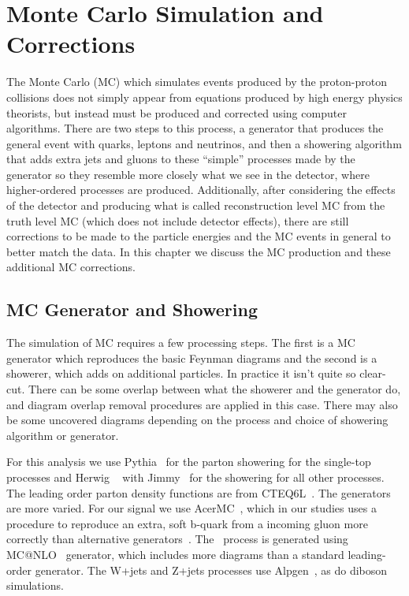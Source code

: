 \chapter{Monte Carlo Simulation and Corrections}\label{chap:MC}
The Monte Carlo (MC) which simulates events produced by the proton-proton collisions does not simply appear from equations produced by high energy physics theorists, but instead must be produced and corrected using computer algorithms.  There are two steps to this process, a generator that produces the general event with quarks, leptons and neutrinos, and then a showering algorithm that adds extra jets and gluons to these ``simple'' processes made by the generator so they resemble more closely what we see in the detector, where higher-ordered processes are produced.  Additionally, after considering the effects of the detector and producing what is called reconstruction level MC from the truth level MC (which does not include detector effects), there are still corrections to be made to the particle energies and the MC events in general to better match the data.  In this chapter we discuss the MC production and these additional MC corrections.

\section{MC Generator and Showering}

The simulation of MC requires a few processing steps.  The first is a MC generator which reproduces the basic Feynman diagrams and the second is a showerer, which adds on additional particles.  In practice it isn't quite so clear-cut.  There can be some overlap between what the showerer and the generator do, and diagram overlap removal procedures are applied in this case.  There may also be some uncovered diagrams depending on the process and choice of showering algorithm or generator.

For this analysis we use {\sc Pythia}~\cite{SAMPLES-PYTHIA} for the parton showering for the single-top processes and {\sc Herwig} ~\cite{SAMPLES-HERWIG} with {\sc Jimmy}~\cite{SAMPLES-JIMMY} for the showering for all other processes.  The leading order parton density functions are from {\sc CTEQ6L}~\cite{cteq6}.  The generators are more varied.  For our signal we use {\sc AcerMC}~\cite{SAMPLES-ACER}, which in our studies uses a procedure to reproduce an extra, soft b-quark from a incoming gluon more correctly than alternative generators~\cite{SAMPLES-ACER:tchan}.  The \ttbar~process is generated using {\sc MC@NLO}~\cite{SAMPLES-MCNLO} generator, which includes more diagrams than a standard leading-order generator.  The W+jets and Z+jets processes use {\sc Alpgen}~\cite{SAMPLES-ALPGEN}, as do diboson simulations.

